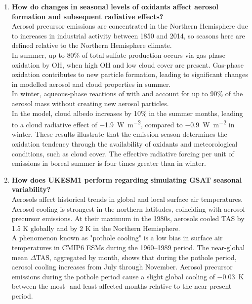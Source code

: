     \begin{enumerate}[resume]
        \item \textbf{How do changes in seasonal levels of oxidants affect aerosol formation and subsequent radiative effects?}\\
        Aerosol precursor emissions are concentrated in the Northern Hemisphere due to increases in industrial activity between 1850 and 2014, so seasons here are defined relative to the Northern Hemisphere climate. \\
        In summer, up to 80\% of total sulfate production occurs via gas-phase oxidation by OH, when high OH and low cloud cover are present. Gas-phase oxidation contributes to new particle formation, leading to significant changes in modelled aerosol and cloud properties in summer. \\
        In winter, aqueous-phase reactions of  with  and  account for up to 90\% of the aerosol mass without creating new aerosol particles. \\
        In the model, cloud albedo increases by 10\% in the summer months, leading to a cloud radiative effect of \qty{-1.9}{W~m^{-2}}, compared to \qty{-0.9}{W~m^{-2}} in winter. These results illustrate that the emission season determines the oxidation tendency through the availability of oxidants and meteorological conditions, such as cloud cover. The effective radiative forcing per unit of  emissions in boreal summer is four times greater than in winter.     
        \item \textbf{How does UKESM1 perform regarding simulating GSAT seasonal variability?}\\
        Aerosols affect historical trends in global and local surface air temperatures. Aerosol cooling is strongest in the northern latitudes, coinciding with aerosol precursor emissions. At their maximum in the 1980s, aerosols cooled TAS by 1.5 K globally and by 2 K in the Northern Hemisphere. \\
        A phenomenon known as "pothole cooling" is a low bias in surface air temperatures in CMIP6 ESMs during the 1960--1989 period. The near-global mean $\Delta$TAS, aggregated by month, shows that during the pothole period, aerosol cooling increases from July through November. Aerosol precursor emissions during the pothole period cause a slight global cooling of \qty{-0.03}{\kelvin} between the most- and least-affected months relative to the near-present period. 
    \end{enumerate}

